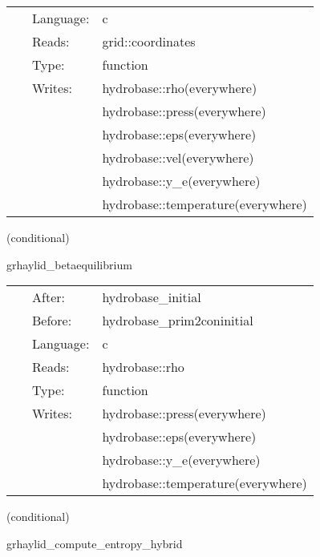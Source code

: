 \hspace{5mm}

 \begin{tabular*}{160mm}{cll} 
~ & Language:  & c \\ 
~ & Reads:  & grid::coordinates \\ 
~ & Type:  & function \\ 
~ & Writes:  & hydrobase::rho(everywhere) \\ 
~& ~ &hydrobase::press(everywhere)\\ 
~& ~ &hydrobase::eps(everywhere)\\ 
~& ~ &hydrobase::vel(everywhere)\\ 
~& ~ &hydrobase::y\_e(everywhere)\\ 
~& ~ &hydrobase::temperature(everywhere)\\ 
\end{tabular*} 


\vspace{5mm}

   (conditional) 

\hspace{5mm} grhaylid\_betaequilibrium 

\hspace{5mm}{\it set y\_e, temperature, entropy, press, eps in neutrino free beta-equilibrium } 


\hspace{5mm}

 \begin{tabular*}{160mm}{cll} 
~ & After:  & hydrobase\_initial \\ 
~ & Before:  & hydrobase\_prim2coninitial \\ 
~ & Language:  & c \\ 
~ & Reads:  & hydrobase::rho \\ 
~ & Type:  & function \\ 
~ & Writes:  & hydrobase::press(everywhere) \\ 
~& ~ &hydrobase::eps(everywhere)\\ 
~& ~ &hydrobase::y\_e(everywhere)\\ 
~& ~ &hydrobase::temperature(everywhere)\\ 
\end{tabular*} 


\vspace{5mm}

   (conditional) 

\hspace{5mm} grhaylid\_compute\_entropy\_hybrid 

